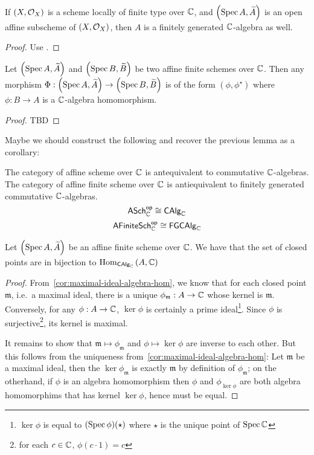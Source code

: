 \begin{proposition}
  If $\left(X, \mathcal{O}_{X}\right)$ is a scheme locally of finite type over $\mathbb{C}$, and $\left(\operatorname*{Spec}{A}, \widetilde{A}\right)$ is an open affine subscheme of $\left(X, \mathcal{O}_{X}\right)$, then $A$ is a finitely generated $\mathbb{C}$-algebra as well.
\end{proposition}

\begin{proof}
Use .
\end{proof}

\begin{proposition}
  Let $\left(\operatorname*{Spec}{A}, \widetilde{A}\right)$ and $\left(\operatorname*{Spec}{B}, \widetilde{B}\right)$ be two affine finite schemes over $\mathbb{C}$. Then any morphism $\Phi : \left(\operatorname*{Spec}{A}, \widetilde{A}\right) \to \left(\operatorname*{Spec}{B}, \widetilde{B}\right)$ is of the form $(\phi, \phi^{\star})$ where $\phi : B \to A$ is a $\mathbb{C}$-algebra homomorphism.
\end{proposition}

\begin{proof}
  TBD %
\end{proof}

Maybe we should construct the following and recover the previous lemma as a corollary:
\begin{proposition}
  The category of affine scheme over $\mathbb{C}$ is antequivalent to commutative $\mathbb{C}$-algebras.
  The category of affine finite scheme over $\mathbb{C}$ is antiequivalent to finitely generated commutative $\mathbb{C}$-algebras.
  \[
    \mathsf{ASch}_{\mathbb{C}}^{\mathsf{op}}\cong \mathsf{CAlg}_{\mathbb{C}}
  \]
  \[
    \mathsf{AFiniteSch}_{\mathbb{C}}^{\mathsf{op}}\cong \mathsf{FGCAlg}_{\mathbb{C}}
  \]
\end{proposition}

\begin{proposition}\label{thm:affine-scheme-closed-points-biject-algebra-hom}
  Let $\left(\operatorname*{Spec}{A}, \widetilde{A}\right)$ be an affine finite scheme over $\mathbb{C}$. We have that the set of closed points are in bijection to
  $\operatorname{Hom}_{\mathsf{CAlg}_{\mathbb{C}}}\left(A, \mathbb{C}\right)$
\end{proposition}

\begin{proof}
  From~\cref{cor:maximal-ideal-algebra-hom}, we know that for each closed point $\mathfrak m$, i.e.\ a maximal ideal, there is a unique $\phi_{\mathfrak m} : A \to \mathbb{C}$ whose kernel is $\mathfrak m$. Conversely, for any $\phi: A \to \mathbb{C}$, $\ker \phi$ is certainly a prime ideal\footnote{$\ker \phi$ is equal to $(\operatorname{Spec} \phi)(\star)$ where $\star$ is the unique point of $\operatorname{Spec}\mathbb{C}$}. Since $\phi$ is surjective\footnote{for each $c \in \mathbb{C}$, $\phi(c \cdot 1) = c$}, its kernel is maximal.


  It remains to show that $\mathfrak m \mapsto \phi_{\mathfrak{m}}$ and $\phi \mapsto \ker \phi$ are inverse to each other. But this follows from the uniqueness from~\cref{cor:maximal-ideal-algebra-hom}:
  Let $\mathfrak{m}$ be a maximal ideal, then the $\ker \phi_{\mathfrak{m}}$ is exactly $\mathfrak m$ by definition of $\phi_{\mathfrak m}$;
  on the otherhand, if $\phi$ is an algebra homomorphism then $\phi$ and $\phi_{\ker \phi}$ are both algebra homomorphims that has kernel $\ker \phi$, hence must be equal.
\end{proof}

